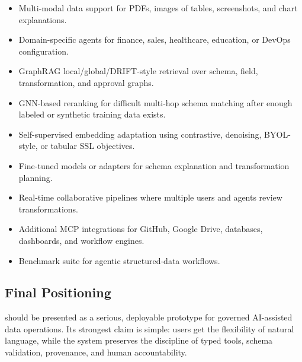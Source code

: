 \begin{itemize}
  \item Multi-modal data support for PDFs, images of tables, screenshots, and chart explanations.
  \item Domain-specific agents for finance, sales, healthcare, education, or DevOps configuration.
  \item GraphRAG local/global/DRIFT-style retrieval over schema, field, transformation, and approval graphs.
  \item GNN-based reranking for difficult multi-hop schema matching after enough labeled or synthetic training data exists.
  \item Self-supervised embedding adaptation using contrastive, denoising, BYOL-style, or tabular SSL objectives.
  \item Fine-tuned models or adapters for schema explanation and transformation planning.
  \item Real-time collaborative pipelines where multiple users and agents review transformations.
  \item Additional MCP integrations for GitHub, Google Drive, databases, dashboards, and workflow engines.
  \item Benchmark suite for agentic structured-data workflows.
\end{itemize}

\subsection{Final Positioning}

\projectname{} should be presented as a serious, deployable prototype for governed AI-assisted data operations. Its strongest claim is simple: users get the flexibility of natural language, while the system preserves the discipline of typed tools, schema validation, provenance, and human accountability.
